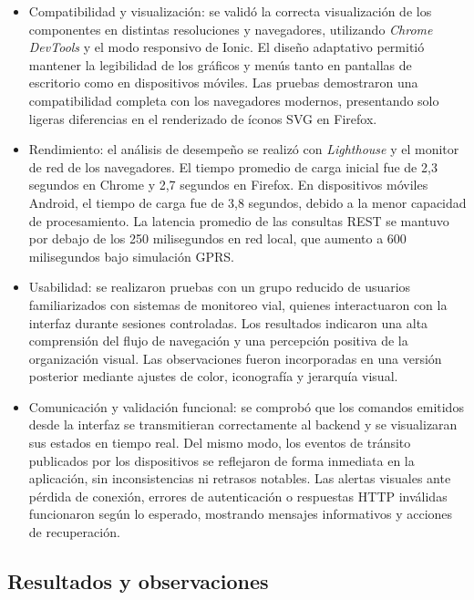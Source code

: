 \begin{itemize}
\item Compatibilidad y visualización: se validó la correcta visualización de los componentes en distintas resoluciones y navegadores, utilizando \textit{Chrome DevTools} \cite{chromedevtools} y el modo responsivo de Ionic.  
El diseño adaptativo permitió mantener la legibilidad de los gráficos y menús tanto en pantallas de escritorio como en dispositivos móviles.  
Las pruebas demostraron una compatibilidad completa con los navegadores modernos, presentando solo ligeras diferencias en el renderizado de íconos SVG en Firefox.

\item Rendimiento: el análisis de desempeño se realizó con \textit{Lighthouse} \cite{lighthouse} y el monitor de red de los navegadores.  
El tiempo promedio de carga inicial fue de 2,3 segundos en Chrome y 2,7 segundos en Firefox.  
En dispositivos móviles Android, el tiempo de carga fue de 3,8 segundos, debido a la menor capacidad de procesamiento.  
La latencia promedio de las consultas REST se mantuvo por debajo de los 250 milisegundos en red local, que aumento a 600 milisegundos bajo simulación GPRS.  

\item Usabilidad: se realizaron pruebas con un grupo reducido de usuarios familiarizados con sistemas de monitoreo vial, quienes interactuaron con la interfaz durante sesiones controladas.  
Los resultados indicaron una alta comprensión del flujo de navegación y una percepción positiva de la organización visual.  
Las  observaciones fueron incorporadas en una versión posterior mediante ajustes de color, iconografía y jerarquía visual.

\item Comunicación y validación funcional: se comprobó que los comandos emitidos desde la interfaz se transmitieran correctamente al backend y se visualizaran sus estados en tiempo real.  
Del mismo modo, los eventos de tránsito publicados por los dispositivos se reflejaron de forma inmediata en la aplicación, sin inconsistencias ni retrasos notables.  
Las alertas visuales ante pérdida de conexión, errores de autenticación o respuestas HTTP inválidas funcionaron según lo esperado, mostrando mensajes informativos y acciones de recuperación.
\end{itemize}


\subsection{Resultados y observaciones}

